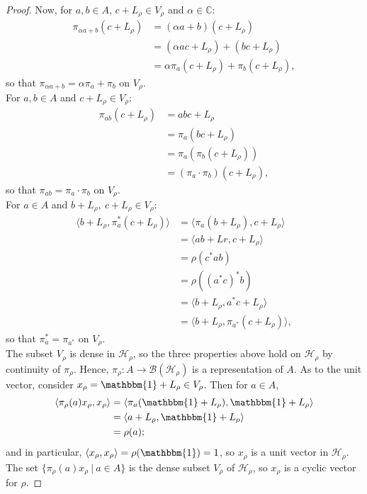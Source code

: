\documentclass[12pt,a4paper]{report}
\theoremstyle{plain}
\theoremstyle{definition}
\newcommand{\1}{\mathbbm{1}}
\newcommand{\B}{\mathcal{B}}
\newcommand{\Hr}{\mathcal{H}_\rho}
\newcommand{\Vr}{V_\rho}
\newcommand{\Lr}{L_\rho}
\newcommand{\xr}{x_\rho}
\begin{document}
\begin{proof}
	Now, for $a,b \in A$, $c+ L_\rho \in \Vr$ and $\alpha \in \mathbb{C}$:
	\begin{align*}
				\pi_{\alpha a+b}(c+\Lr)
		&=		(\alpha a+b) (c+\Lr)										\\
		&=		(\alpha ac +\Lr) + (bc+\Lr)									\\
		&=		\alpha \pi_a (c+\Lr) + \pi_b(c+\Lr),
	\end{align*}
	so that $\pi_{\alpha a + b} = \alpha \pi_a +\pi_b$ on $\Vr$.\\
	For $a,b \in A$ and $c+ L_\rho \in \Vr$:
	\begin{align*}
		\pi_{ab}(c+\Lr)
		&=		abc+\Lr														\\
		&=		\pi_a (bc+\Lr)												\\
		&=		\pi_a (\pi_b (c+\Lr))										\\
		&=		(\pi_a \cdot \pi_b) (c+\Lr),
	\end{align*}
	so that $\pi_{a b} = \pi_a \cdot \pi_b$ on $\Vr$.\\
	For $a\in A$ and $b+ L_\rho,~c+ L_\rho \in \Vr$:
	\begin{align*}
				\langle b+\Lr, \pi_a^\ast (c+\Lr) \rangle 
		&=		\langle \pi_a (b+\Lr), c+\Lr \rangle						\\
		&=		\langle ab +Lr, c+\Lr \rangle								\\
		&=		\rho(c^\ast ab)												\\
		&=		\rho((a^\ast c)^\ast b)										\\
		&=		\langle b+\Lr, a^\ast c+\Lr \rangle							\\
		&=		\langle b+\Lr, \pi_{a^\ast}(c+\Lr)\rangle,
	\end{align*}
	so that $ \pi_a^\ast = \pi_{a^\ast}$ on $\Vr$.\\
	The subset $\Vr$ is dense in $\Hr$, so the three properties above hold on $\Hr$ by continuity of 
	$\pi_\rho$. Hence, $\pi_\rho: A \to \B(\Hr)$ is a representation of $A$.
	As to the unit vector, consider $\xr = \1 + \Lr \in \Vr$. Then for $a \in A$,
	\begin{align*}
				\langle \pi_\rho(a)\xr ,\xr \rangle 
		&=		\langle \pi_a(\1+\Lr), \1+\Lr \rangle						\\
		&=		\langle a+\Lr, \1+\Lr \rangle								\\
		&=		\rho(a);
	\end{align*}
	and in particular, $\langle \xr,\xr \rangle = \rho (\1) = 1$, so $\xr$ is a unit vector in $\Hr$. 
	The set $\{\pi_\rho(a)x_\rho ~|~ a\in A\}$ is the dense subset $\Vr$ of $\Hr$, so $x_\rho$ is a 
	cyclic vector for $\rho$.
\end{proof}
\end{document}
